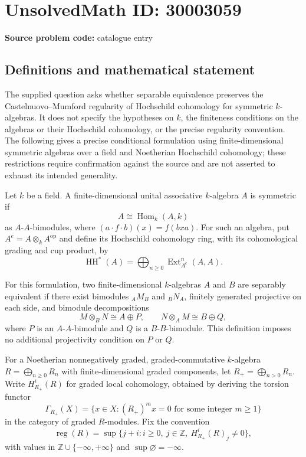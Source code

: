 \documentclass[11pt]{article}
\begin{document}
\section*{UnsolvedMath ID: 30003059}
\textbf{Source problem code:} catalogue entry
\subsection{Definitions and mathematical statement}
The supplied question asks whether separable equivalence preserves the Castelnuovo--Mumford regularity of Hochschild cohomology for symmetric \(k\)-algebras. It does not specify the hypotheses on \(k\), the finiteness conditions on the algebras or their Hochschild cohomology, or the precise regularity convention. The following gives a precise conditional formulation using finite-dimensional symmetric algebras over a field and Noetherian Hochschild cohomology; these restrictions require confirmation against the source and are not asserted to exhaust its intended generality.

Let \(k\) be a field. A finite-dimensional unital associative \(k\)-algebra \(A\) is symmetric if
\[
A\cong \operatorname{Hom}_k(A,k)
\]
as \(A\)-\(A\)-bimodules, where \((a\cdot f\cdot b)(x)=f(bxa)\). For such an algebra, put \(A^e=A\otimes_k A^{\mathrm{op}}\) and define its Hochschild cohomology ring, with its cohomological grading and cup product, by
\[
\operatorname{HH}^*(A)=\bigoplus_{n\geq 0}\operatorname{Ext}_{A^e}^{n}(A,A).
\]

For this formulation, two finite-dimensional \(k\)-algebras \(A\) and \(B\) are separably equivalent if there exist bimodules \({}_A M_B\) and \({}_B N_A\), finitely generated projective on each side, and bimodule decompositions
\[
M\otimes_B N\cong A\oplus P,
\qquad
N\otimes_A M\cong B\oplus Q,
\]
where \(P\) is an \(A\)-\(A\)-bimodule and \(Q\) is a \(B\)-\(B\)-bimodule. This definition imposes no additional projectivity condition on \(P\) or \(Q\).

For a Noetherian nonnegatively graded, graded-commutative \(k\)-algebra \(R=\bigoplus_{n\geq0}R_n\) with finite-dimensional graded components, let \(R_+=\bigoplus_{n>0}R_n\). Write \(H^i_{R_+}(R)\) for graded local cohomology, obtained by deriving the torsion functor
\[
\Gamma_{R_+}(X)=\{x\in X:(R_+)^m x=0\text{ for some integer }m\geq1\}
\]
in the category of graded \(R\)-modules. Fix the convention
\[
\operatorname{reg}(R)=
\sup\{j+i:i\geq0,\ j\in\mathbb Z,\ H^i_{R_+}(R)_j\neq0\},
\]
with values in \(\mathbb Z\cup\{-\infty,+\infty\}\) and \(\sup\varnothing=-\infty\).
\end{document}
